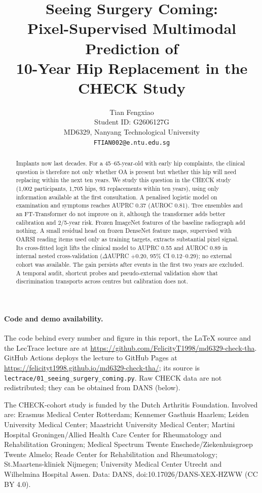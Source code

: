 \documentclass{article}
\title{Seeing Surgery Coming:\\ Pixel-Supervised Multimodal Prediction of\\ 10-Year Hip Replacement in the CHECK Study}
\author{%
  Tian Fengxiao \\
  Student ID: G2606127G \\
  MD6329, Nanyang Technological University \\
  \texttt{FTIAN002@e.ntu.edu.sg}
}
\newcommand{\repourl}{https://github.com/FelicityT1998/md6329-check-tha}
\newcommand{\demourl}{https://felicityt1998.github.io/md6329-check-tha/}
\begin{document}
\maketitle

\begin{abstract}
Implants now last decades. For a 45--65-year-old with early hip complaints, the clinical question is therefore not only
whether OA is present but whether this hip will need replacing within the next ten years. We study this question in the
CHECK study (1,002 participants, 1,705 hips, 93 replacements within ten years), using only information available at the
first consultation. A penalised logistic model on examination and symptoms reaches AUPRC 0.37 (AUROC 0.81). Tree
ensembles and an FT-Transformer do not improve on it, although the transformer adds better calibration and 2/5-year risk.
Frozen ImageNet features of the baseline radiograph add nothing. A small residual head on frozen DenseNet feature maps,
supervised with OARSI reading items used only as training targets, extracts substantial pixel signal. Its cross-fitted
logit lifts the clinical model to AUPRC 0.55 and AUROC 0.89 in internal nested cross-validation ($\Delta$AUPRC $+0.20$,
95\% CI 0.12--0.29); no external cohort was available. The gain persists after events in the first two years are
excluded. A temporal audit, shortcut probes and pseudo-external
validation show that discrimination transports across centres but calibration does not.
\end{abstract}






{\raggedright\paragraph{Code and demo availability.} The code behind every number and figure in this report, the LaTeX source and
the LecTrace lecture are at \url{\repourl}. GitHub Actions deploys the lecture to GitHub Pages at \url{\demourl}; its
source is \texttt{lectrace/01\_seeing\_surgery\_coming.py}. Raw CHECK data are not redistributed; they can be obtained
from DANS (below).\par}

\begin{ack}
The CHECK-cohort study is funded by the Dutch Arthritis Foundation. Involved are: Erasmus Medical Center Rotterdam;
Kennemer Gasthuis Haarlem; Leiden University Medical Center; Maastricht University Medical Center; Martini Hospital
Groningen/Allied Health Care Center for Rheumatology and Rehabilitation Groningen; Medical Spectrum Twente
Enschede/Ziekenhuisgroep Twente Almelo; Reade Center for Rehabilitation and Rheumatology; St.Maartens-kliniek Nijmegen;
University Medical Center Utrecht and Wilhelmina Hospital Assen.
Data: DANS, doi:10.17026/DANS-XEX-HZWW (CC BY 4.0).
\end{ack}

{\small


}

\appendix

\end{document}
